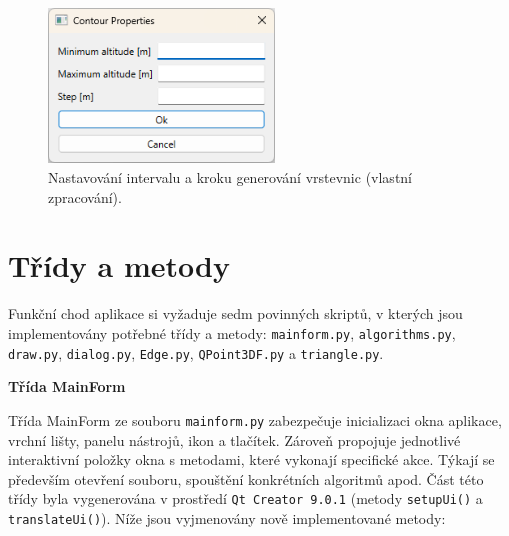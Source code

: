 \begin{figure}[H]
\centering
\includegraphics[width=6cm]{images/contourpropshowcase.png}
    \caption{Nastavování intervalu a kroku generování vrstevnic (vlastní zpracování).}
\end{figure}

\bigbreak

\section*{Třídy a metody}
\par Funkční chod aplikace si vyžaduje sedm povinných skriptů, v kterých jsou implementovány potřebné třídy a metody: \verb|mainform.py|, \verb|algorithms.py|, \verb|draw.py|, \verb|dialog.py|, \verb|Edge.py|, \verb|QPoint3DF.py| a \verb|triangle.py|.
\bigbreak
\par {\large\textbf{Třída MainForm} }
\par Třída MainForm ze souboru \verb|mainform.py| zabezpečuje inicializaci okna aplikace, vrchní lišty, panelu nástrojů, ikon a tlačítek. Zároveň propojuje jednotlivé interaktivní položky okna s metodami, které vykonají specifické akce. Týkají se především otevření souboru, spouštění konkrétních algoritmů apod. Část této třídy byla vygenerována v prostředí \verb|Qt Creator 9.0.1| (metody \verb|setupUi()| a \verb|translateUi()|). Níže jsou vyjmenovány nově implementované metody:

